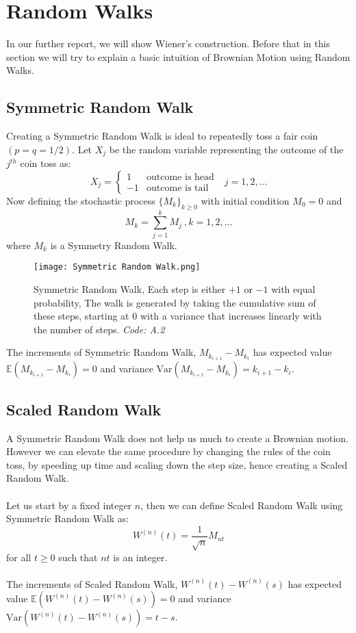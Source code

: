 \documentclass[12pt]{report}
\begin{document}
\section{Random Walks}
In our further report, we will show Wiener's construction. Before that in this section we will try to explain a basic intuition of Brownian Motion using Random Walks.

\subsection{Symmetric Random Walk}
Creating a Symmetric Random Walk is ideal to repeatedly toss a
fair coin $(p= q = 1/2)$. Let $X_j$ be the random variable representing the outcome of the $j^{th}$ coin toss as:
\[
X_j = \begin{cases}
    1 & \text{outcome is head} \\
    -1& \text{outcome is tail}
\end{cases} \ \ \ j = 1,2,...
\]
Now defining the stochastic process $\{M_k\}_{k\geq 0}$ with initial condition $M_0 = 0$ and
\[
M_k = \sum_{j=1}^kM_j\ ,k= 1,2,...
\]
where $M_k$ is a Symmetry Random Walk.

\begin{figure}[H]
    \centering
    \texttt{[image: Symmetric Random Walk.png]}
    \caption{Symmetric Random Walk, Each step is either $+1$ or $-1$ with equal probability, The walk is generated by taking the cumulative sum of these steps, starting at $0$ with a variance that increases linearly with the number of steps. \textit{Code: A.2}}
    \label{fig:enter-label}
\end{figure}

\noindent
The increments of Symmetric Random Walk, $M_{k_{i+1}} - M_{k_{i}}$ has expected value $\mathbb{E}(M_{k_{i+1}} - M_{k_{i}}) = 0$ and variance $\text{Var}(M_{k_{i+1}} - M_{k_{i}}) = k_{i+1}-k_{i}$.

\subsection{Scaled Random Walk}
A Symmetric Random Walk does not help us much to create a Brownian motion. However we can elevate the same procedure by changing the rules of the coin toss, by speeding up time and scaling down the step size, hence creating a Scaled Random Walk.\\
\\
\noindent
Let us start by a fixed integer $n$, then we can define Scaled Random Walk using Symmetric Random Walk as:
\[
W^{(n)}(t) = \frac{1}{\sqrt{n}}M_{nt}
\]
for all $t\geq 0$ such that $nt$ is an integer.\\
\\
\noindent
The increments of Scaled Random Walk, $W^{(n)}(t) - W^{(n)}(s)$ has expected value $\mathbb{E}(W^{(n)}(t) - W^{(n)}(s)) = 0$ and variance $\text{Var}(W^{(n)}(t) - W^{(n)}(s)) = t-s$.
\end{document}
